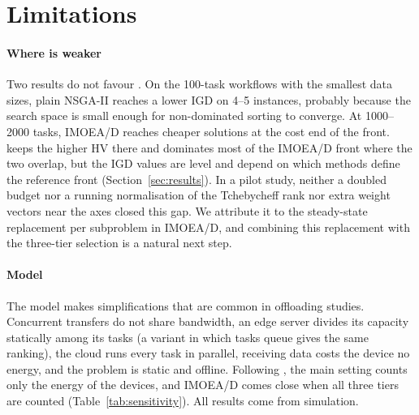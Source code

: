 \section{Limitations}
\label{sec:discussion}
\label{sec:validity}

\paragraph{Where \ours{} is weaker}
Two results do not favour \ours{}. On the 100-task workflows with the smallest data sizes, plain NSGA-II reaches a lower
IGD on 4--5 instances, probably because the search space is small enough for non-dominated sorting to converge. At
1000--2000 tasks, IMOEA/D reaches cheaper solutions at the cost end of the front. \ours{} keeps the higher HV there and
dominates most of the IMOEA/D front where the two overlap, but the IGD values are level and depend on which methods
define the reference front (Section~\ref{sec:results}). In a pilot study, neither a doubled budget nor a running
normalisation of the Tchebycheff rank nor extra weight vectors near the axes closed this gap. We attribute it to the
steady-state replacement per subproblem in IMOEA/D, and combining this replacement with the three-tier selection is a
natural next step.

\paragraph{Model}
The model makes simplifications that are common in offloading studies. Concurrent transfers do not share bandwidth, an
edge server divides its capacity statically among its tasks (a variant in which tasks queue gives the same ranking),
the cloud runs every task in parallel, receiving data costs the device no energy, and the problem is static and
offline. Following \citet{jin2026imoeadqn}, the main setting counts only the energy of the devices, and IMOEA/D comes
close when all three tiers are counted (Table~\ref{tab:sensitivity}). All results come from simulation.

